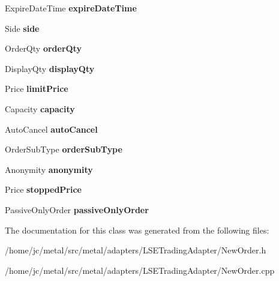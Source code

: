 \begin{DoxyCompactItemize}
\item 
\hypertarget{classMetal_1_1LSE_1_1NewOrder_a75f27f7515b6214b615681e5fc5074c3}{}Expire\+Date\+Time {\bfseries expire\+Date\+Time}\label{classMetal_1_1LSE_1_1NewOrder_a75f27f7515b6214b615681e5fc5074c3}

\item 
\hypertarget{classMetal_1_1LSE_1_1NewOrder_ac13fa3b75b0b41ee60fb6fcf3b57fb31}{}Side {\bfseries side}\label{classMetal_1_1LSE_1_1NewOrder_ac13fa3b75b0b41ee60fb6fcf3b57fb31}

\item 
\hypertarget{classMetal_1_1LSE_1_1NewOrder_a081492c830d00f180aa37b5e50e0425a}{}Order\+Qty {\bfseries order\+Qty}\label{classMetal_1_1LSE_1_1NewOrder_a081492c830d00f180aa37b5e50e0425a}

\item 
\hypertarget{classMetal_1_1LSE_1_1NewOrder_a000987cb8d5cb677b0eebd0624c22642}{}Display\+Qty {\bfseries display\+Qty}\label{classMetal_1_1LSE_1_1NewOrder_a000987cb8d5cb677b0eebd0624c22642}

\item 
\hypertarget{classMetal_1_1LSE_1_1NewOrder_acff28c03d42db0449f23f480be72c3a9}{}Price {\bfseries limit\+Price}\label{classMetal_1_1LSE_1_1NewOrder_acff28c03d42db0449f23f480be72c3a9}

\item 
\hypertarget{classMetal_1_1LSE_1_1NewOrder_aeace92cd76c0bb8539f82fdfff170115}{}Capacity {\bfseries capacity}\label{classMetal_1_1LSE_1_1NewOrder_aeace92cd76c0bb8539f82fdfff170115}

\item 
\hypertarget{classMetal_1_1LSE_1_1NewOrder_aacc7198bc8dee4a9bf98bd8bc13dc85b}{}Auto\+Cancel {\bfseries auto\+Cancel}\label{classMetal_1_1LSE_1_1NewOrder_aacc7198bc8dee4a9bf98bd8bc13dc85b}

\item 
\hypertarget{classMetal_1_1LSE_1_1NewOrder_a11797541566225395362ff7f9c0e3557}{}Order\+Sub\+Type {\bfseries order\+Sub\+Type}\label{classMetal_1_1LSE_1_1NewOrder_a11797541566225395362ff7f9c0e3557}

\item 
\hypertarget{classMetal_1_1LSE_1_1NewOrder_ab9c132be0c599c5d113d20603bb6f19d}{}Anonymity {\bfseries anonymity}\label{classMetal_1_1LSE_1_1NewOrder_ab9c132be0c599c5d113d20603bb6f19d}

\item 
\hypertarget{classMetal_1_1LSE_1_1NewOrder_abf0f20401650effe0dba393616128d0b}{}Price {\bfseries stopped\+Price}\label{classMetal_1_1LSE_1_1NewOrder_abf0f20401650effe0dba393616128d0b}

\item 
\hypertarget{classMetal_1_1LSE_1_1NewOrder_a4debc1666c97f2c3127ed05fe9373856}{}Passive\+Only\+Order {\bfseries passive\+Only\+Order}\label{classMetal_1_1LSE_1_1NewOrder_a4debc1666c97f2c3127ed05fe9373856}

\end{DoxyCompactItemize}


The documentation for this class was generated from the following files\+:\begin{DoxyCompactItemize}
\item 
/home/jc/metal/src/metal/adapters/\+L\+S\+E\+Trading\+Adapter/New\+Order.\+h\item 
/home/jc/metal/src/metal/adapters/\+L\+S\+E\+Trading\+Adapter/New\+Order.\+cpp\end{DoxyCompactItemize}
